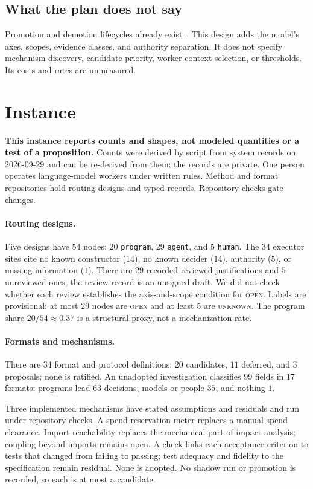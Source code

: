 \documentclass[11pt]{article}
\theoremstyle{definition}
\theoremstyle{remark}
\newcommand{\cstate}[1]{\textup{\textsc{#1}}}
\begin{document}
\subsection{What the plan does not say}\label{sec:plannot}
Promotion and demotion lifecycles already exist~\cite{malik2026crystallization}.
This design adds the model's axes, scopes, evidence classes, and authority separation.
It does not specify mechanism discovery, candidate priority, worker context selection, or thresholds.
Its costs and rates are unmeasured.

\section{Instance}\label{sec:instance}
\textbf{This instance reports counts and shapes, not modeled quantities or a test of a proposition.}
Counts were derived by script from system records on 2026-09-29 and can be re-derived from them;
the records are private.
One person operates language-model workers under written rules.
Method and format repositories hold routing designs and typed records.
Repository checks gate changes.

\paragraph{Routing designs.}
Five designs have $54$ nodes: $20$ \texttt{program}, $29$ \texttt{agent}, and $5$ \texttt{human}.
The $34$ executor sites cite no known constructor ($14$), no known decider ($14$),
authority ($5$), or missing information ($1$).
There are $29$ recorded reviewed justifications and $5$ unreviewed ones; the review record is an
unsigned draft. We did not check whether each review establishes the axis-and-scope condition
for \cstate{open}. Labels are provisional: at most $29$ nodes are \cstate{open} and at least $5$
are \cstate{unknown}. The program share $20/54\approx0.37$ is a structural proxy, not a
mechanization rate.

\paragraph{Formats and mechanisms.}
There are $34$ format and protocol definitions: $20$ candidates, $11$ deferred, and $3$ proposals;
none is ratified. An unadopted investigation classifies $99$ fields in $17$ formats:
programs lead $63$ decisions, models or people $35$, and nothing $1$.

Three implemented mechanisms have stated assumptions and residuals and run under repository checks.
A spend-reservation meter replaces a manual spend clearance.
Import reachability replaces the mechanical part of impact analysis; coupling beyond imports
remains open. A check links each acceptance criterion to tests that changed from failing to passing;
test adequacy and fidelity to the specification remain residual.
None is adopted. No shadow run or promotion is recorded, so each is at most a candidate.
\end{document}
